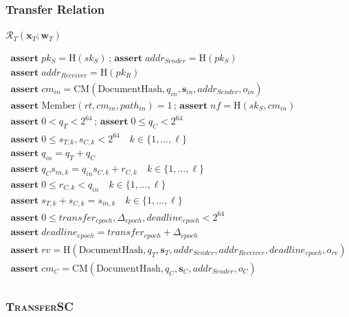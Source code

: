 \documentclass[11pt,a4paper]{extarticle}
\newcommand{\CM}{\mathrm{CM}}
\newcommand{\Hash}{\mathrm{H}}
\newcommand{\Member}{\mathrm{Member}}
\newcommand{\DocumentHash}{\mathrm{DocumentHash}}
\newcommand{\addrSender}{addr_{Sender}}
\newcommand{\addrReceiver}{addr_{Receiver}}
\newcommand{\DeltaEpoch}{\Delta_{epoch}}
\newcommand{\Assert}{\mathbf{assert}\;}
\newenvironment{schemeblock}
{%
  \begingroup
  \setlength{\jot}{8pt}%
  \setlength{\parskip}{0pt}%
  \setlength{\abovedisplayskip}{9pt}%
  \setlength{\belowdisplayskip}{0pt}%
  \setlength{\abovedisplayshortskip}{9pt}%
  \setlength{\belowdisplayshortskip}{0pt}%
  \begin{mdframed}[
    linewidth=0.4pt,
    linecolor=black,
    innerleftmargin=8pt,
    innerrightmargin=8pt,
    innertopmargin=8pt,
    innerbottommargin=8pt,
    skipabove=0pt,
    skipbelow=5pt,
    splittopskip=8pt,
    splitbottomskip=8pt
  ]
  \centering
}
{%
  \end{mdframed}
  \endgroup
}
\begin{document}
\subsubsection{Transfer Relation}

\begin{schemeblock}
\(
  \mathcal{R}_T(\mathbf{x}_T;\mathbf{w}_T)
\)

\begin{gather*}
\Assert pk_S=\Hash(sk_S)
  \,;\,
  \Assert \addrSender=\Hash(pk_S)
  \\
\Assert \addrReceiver=\Hash(pk_R)
  \\
\Assert
  cm_{in}=\CM(\DocumentHash,q_{in},\mathbf{s}_{in},\addrSender,o_{in})
  \\
\Assert\Member(rt,cm_{in},path_{in})=1
  \,;\,
  \Assert nf=\Hash(sk_S,cm_{in})
  \\
\Assert 0<q_T<2^{64}
  \,;\,
  \Assert 0\leq q_C<2^{64}
  \\
\Assert 0\leq s_{T,k},s_{C,k}<2^{64}
  \quad k\in\{1,\ldots,\ell\}
  \\
\Assert q_{in}=q_T+q_C
  \\
\Assert
  q_Cs_{in,k}=q_{in}s_{C,k}+r_{C,k}
  \quad k\in\{1,\ldots,\ell\}
  \\
\Assert 0\leq r_{C,k}<q_{in}
  \quad k\in\{1,\ldots,\ell\}
  \\
\Assert s_{T,k}+s_{C,k}=s_{in,k}
  \quad k\in\{1,\ldots,\ell\}
  \\
\Assert
0\leq transfer_{epoch},\DeltaEpoch,deadline_{epoch}<2^{64}
  \\
\Assert
deadline_{epoch}=transfer_{epoch}+\DeltaEpoch
  \\
\Assert
  rv=
  \Hash(
    \DocumentHash,q_T,\mathbf{s}_T,
    \addrSender,\addrReceiver,deadline_{epoch},o_{rv}
  )
  \\
\Assert
  cm_C=\CM(\DocumentHash,q_C,\mathbf{s}_C,\addrSender,o_C)
  \\
\end{gather*}
\end{schemeblock}

\subsubsection{\textsc{TransferSC}}
\end{document}
